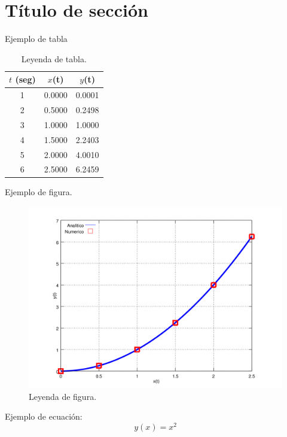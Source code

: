 \section{Título de sección}

Ejemplo de tabla

\begin{table}[h!]
\centering
\caption{Leyenda de tabla.}
\label{tab:comp}
\begin{tabular}{|c|c|c|}
  \hline
  $t$ (seg) & $x$(t) & $y$(t)\\
  \hline
  1 & 0.0000 & 0.0001\\
  2 & 0.5000 & 0.2498\\
  3 & 1.0000 & 1.0000\\
  4 & 1.5000 & 2.2403\\
  5 & 2.0000 & 4.0010\\
  6 & 2.5000 & 6.2459\\
  \hline
\end{tabular}
\end{table}

Ejemplo de figura.

\begin{figure}[h!]
\label{fig:comp}
\includegraphics[width=.8\textwidth]{imagenes/chap4/x_vs_y}
\caption{Leyenda de figura.}
\end{figure}
Ejemplo de ecuación:
\begin{equation}
y(x)=x^2
\end{equation}
